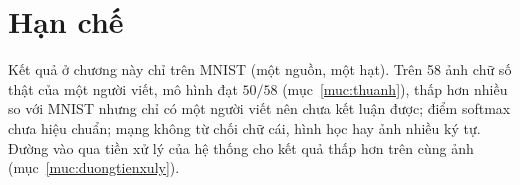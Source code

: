 \section{Hạn chế}
Kết quả ở chương này chỉ trên MNIST (một nguồn, một hạt). Trên 58 ảnh chữ số thật của một người viết, mô hình đạt $50/58$ (mục~\ref{muc:thuanh}), thấp hơn nhiều so với MNIST nhưng chỉ có một người viết nên chưa kết luận được; điểm softmax chưa hiệu chuẩn; mạng không từ chối chữ cái, hình học hay ảnh nhiều ký tự.
Đường vào qua tiền xử lý của hệ thống cho kết quả thấp hơn trên cùng ảnh (mục~\ref{muc:duongtienxuly}).
